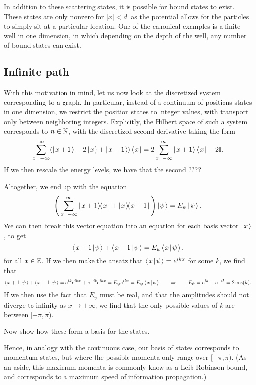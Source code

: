 In addition to these scattering states, it is possible for bound states to exist.  These states are only nonzero for $|x| <d$, as the potential allows for the particles to simply sit at a particular location. One of the canonical examples is a finite well in one dimension, in which depending on the depth of the well, any number of bound states can exist.


\subsection{Infinite path}

With this motivation in mind, let us now look at the discretized system corresponding to a graph.  In particular, instead of a continuum of positions states in one dimension, we restrict the position states to integer values, with transport only between neighboring integers.  Explicitly, the Hilbert space of such a system corresponds to $n\in \mathbb{N}$, with the discretized second derivative taking the form
\[
  \sum_{x=-\infty}^\infty (\left|\mspace{2mu} x + 1 \mspace{2mu} \right\rangle - 2\left|\mspace{2mu} x \mspace{2mu} \right\rangle + \left|\mspace{2mu} x-1 \mspace{2mu} \right\rangle) \left\langle\mspace{2mu} x \mspace{2mu} \right| = 2\sum_{x=-\infty}^\infty \left|\mspace{2mu} x+1 \mspace{2mu} \right\rangle \left\langle\mspace{2mu} x \mspace{2mu} \right| - 2 \mathbb{I}.
\]
If we then rescale the energy levels, we have that the second ????

Altogether, we end up with the equation
\begin{equation}
  \Bigg(\sum_{x=-\infty}^\infty \left|\mspace{2mu} x+1\mspace{2mu} \middle\rangle\mspace{-2mu} \middle\langle\mspace{2mu} x\mspace{2mu}\right| + \left|\mspace{2mu} x\mspace{2mu} \middle\rangle\mspace{-2mu} \middle\langle\mspace{2mu} x+1\mspace{2mu}\right| \Bigg) \left|\mspace{2mu} \psi \mspace{2mu} \right\rangle = E_\psi \left|\mspace{2mu} \psi \mspace{2mu} \right\rangle.
\end{equation}
We can then break this vector equation into an equation for each basis vector $\left|\mspace{2mu} x \mspace{2mu} \right\rangle$, to get
\begin{equation}
  \left\langle\mspace{2mu} x+1\mspace{2mu} \middle|\mspace{2mu} \psi\mspace{2mu} \right\rangle + \left\langle\mspace{2mu} x-1\mspace{2mu} \middle|\mspace{2mu} \psi\mspace{2mu} \right\rangle = E_\psi \left\langle\mspace{2mu} x\mspace{2mu} \middle|\mspace{2mu} \psi\mspace{2mu} \right\rangle.
\end{equation}
for all $x\in \mathbb{Z}$.  If we then make the ansatz that $\left\langle\mspace{2mu} x\mspace{2mu} \middle|\mspace{2mu} \psi\mspace{2mu} \right\rangle = e^{i k x}$ for some $k$, we find that
\begin{equation}
  \left\langle\mspace{2mu} x+1\mspace{2mu} \middle|\mspace{2mu} \psi\mspace{2mu} \right\rangle + \left\langle\mspace{2mu} x-1\mspace{2mu} \middle|\mspace{2mu} \psi\mspace{2mu} \right\rangle = e^{i k } e^{i k x} + e^{-ik} e^{ikx} = E_\psi e^{ik x} = E_\psi \left\langle\mspace{2mu} x\mspace{2mu} \middle|\mspace{2mu} \psi\mspace{2mu} \right\rangle \qquad \Rightarrow \qquad E_\psi = e^{ik} + e^{-i k} = 2 \cos(k).
\end{equation}
If we then use the fact that $E_\psi$ must be real, and that the amplitudes should not diverge to infinity as $x\rightarrow \pm \infty$, we find that the only possible values of $k$ are between $[-\pi,\pi)$.  

Now show how these form a basis for the states.

Hence, in analogy with the continuous case, our basis of states corresponds to momentum states, but where the possible momenta only range over $[-\pi,\pi)$.  (As an aside, this maximum momenta is commonly know as a Leib-Robinson bound, and corresponds to a maximum speed of information propagation.)

